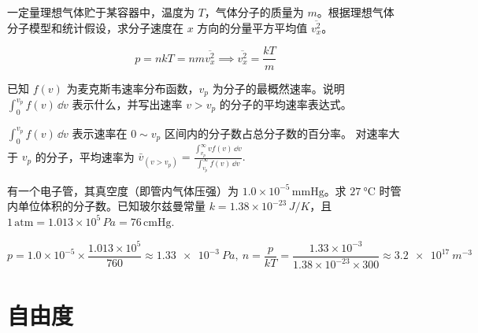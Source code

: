 \documentclass[lang=cn,11pt]{elegantbook}
\begin{document}
\begin{exercise}
一定量理想气体贮于某容器中，温度为 \(T\)，气体分子的质量为 \(m\)。根据理想气体分子模型和统计假设，求分子速度在 \(x\) 方向的分量平方平均值 \(\overline{v_x^2}\)。
\end{exercise}

\begin{solution}
 \[p=nkT=nm\overline{v_x^2}\implies \overline{v_x^2} =\frac{kT}{m}\]
\end{solution}

\begin{exercise}[用麦克斯韦分布函数表示速率区间和条件平均速率]
已知 \(f(v)\) 为麦克斯韦速率分布函数，\(v_p\) 为分子的最概然速率。说明
 \(\int_0^{v_p}f(v)\,\dd v\) 表示什么，并写出速率 \(v>v_p\) 的分子的平均速率表达式。
\end{exercise}

\begin{solution}
 \(\int_0^{v_p}f(v)\,\dd v\) 表示速率在 \(0\sim v_p\) 区间内的分子数占总分子数的百分率。
对速率大于 \(v_p\) 的分子，平均速率为 \(\displaystyle\bar v_{(v>v_p)} =\frac{\int_{v_p}^{\infty}v f(v)\,\dd v} {\int_{v_p}^{\infty}f(v)\,\dd v}.\) 
\end{solution}

\begin{exercise}
有一个电子管，其真空度（即管内气体压强）为 \(1.0\times10^{-5}\,\mathrm{mmHg}\)。求 \(\SI{27}{\celsius}\) 时管内单位体积的分子数。已知玻尔兹曼常量 \(k=1.38\times10^{-23}\,\si{J/K}\)，且
 \(1\,\mathrm{atm}=1.013\times10^5\,\si{Pa}=76\,\mathrm{cmHg}.\) 
\end{exercise}

\begin{solution}
\[
p=1.0\times10^{-5}\times \frac{1.013\times10^5}{760}
\approx \SI{1.33e-3}{Pa},~n=\frac{p}{kT}=\frac{1.33\times10^{-3}}{1.38\times10^{-23}\times300} \approx \SI{3.2e17}{m^{-3}}
\]
\end{solution}

\section{自由度}
\end{document}

